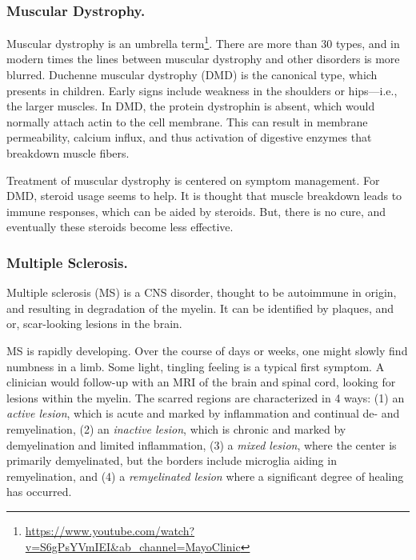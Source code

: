 \subsubsection{Muscular Dystrophy.}

Muscular dystrophy is an umbrella term\footnote{\url{https://www.youtube.com/watch?v=S6gPsYVmIEI\&ab_channel=MayoClinic}}. There are more than 30 types, and in modern times the lines between muscular dystrophy and other disorders is more blurred. Duchenne muscular dystrophy (DMD) is the canonical type, which presents in children. Early signs include weakness in the shoulders or hips---i.e., the larger muscles. In DMD, the protein dystrophin is absent, which would normally attach actin to the cell membrane. This can result in membrane permeability, calcium influx, and thus activation of digestive enzymes that breakdown muscle fibers.\newline

Treatment of muscular dystrophy is centered on symptom management. For DMD, steroid usage seems to help. It is thought that muscle breakdown leads to immune responses, which can be aided by steroids. But, there is no cure, and eventually these steroids become less effective. 

\subsubsection{Multiple Sclerosis.}

\label{sec:MSdigression}

Multiple sclerosis (MS) is a CNS disorder, thought to be autoimmune in origin, and resulting in degradation of the myelin. It can be identified by plaques, and or, scar-looking lesions in the brain.\newline

MS is rapidly developing. Over the course of days or weeks, one might slowly find numbness in a limb. Some light, tingling feeling is a typical first symptom. A clinician would follow-up with an MRI of the brain and spinal cord, looking for lesions within the myelin. The scarred regions are characterized in 4 ways: (1) an \textit{active lesion}, which is acute and marked by inflammation and continual de- and remyelination, (2) an \textit{inactive lesion}, which is chronic and marked by demyelination and limited inflammation, (3) a \textit{mixed lesion}, where the center is primarily demyelinated, but the borders include microglia aiding in remyelination, and (4) a \textit{remyelinated lesion} where a significant degree of healing has occurred.\newline

